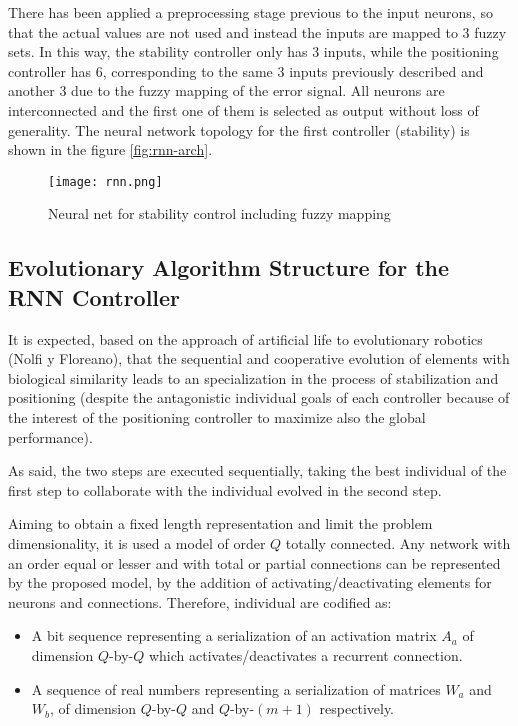 There has been applied a preprocessing stage previous to the input
neurons, so that the actual values are not used and instead the inputs
are mapped to 3 fuzzy sets. In this way, the stability controller only
has 3 inputs, while the positioning controller has 6, corresponding to
the same 3 inputs previously described and another 3 due to the fuzzy
mapping of the error signal. All neurons are interconnected and the
first one of them is selected as output without loss of
generality. The neural network topology for the first controller
(stability) is shown in the figure \ref{fig:rnn-arch}.

\begin{figure}[t]
\label{rnn-arch}
\centering
\texttt{[image: rnn.png]}
\caption{Neural net for stability control including fuzzy mapping}
\label{rnn}
\end{figure}

\subsection{Evolutionary Algorithm Structure for the RNN Controller}
It is expected, based on the approach of artificial life to
evolutionary robotics (Nolfi y Floreano), that the sequential and
cooperative evolution of elements with biological similarity leads to
an specialization in the process of stabilization and positioning
(despite the antagonistic individual goals of each controller because of the
interest of the positioning controller to maximize also the global
performance).

As said, the two steps are executed sequentially, taking the best
individual of the first step to collaborate with the individual
evolved in the second step. 

Aiming to obtain a fixed length representation and limit the problem
dimensionality, it is used a model of order $Q$ totally connected. Any
network with an order equal or lesser and with total or partial
connections can be represented by the proposed model, by the addition
of activating/deactivating elements for neurons and
connections. Therefore, individual are codified as: 

\begin{itemize}
 \item A bit sequence representing a serialization of an activation matrix
   $A_a$ of dimension $Q$-by-$Q$ which activates/deactivates a
   recurrent connection.
 \item A sequence of real numbers representing a serialization of
   matrices $W_a$ and $W_b$, of dimension $Q$-by-$Q$ and
   $Q$-by-$(m+1)$ respectively.
\end{itemize}


